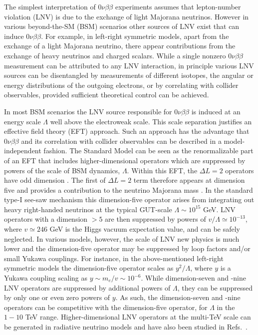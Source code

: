 \documentclass[letterpaper,11pt]{article}
\begin{document}
The simplest
interpretation of $0 \nu \beta \beta$ experiments assumes that lepton-number violation (LNV) is due to the exchange of light Majorana neutrinos. 
However in various beyond-the-SM (BSM) scenarios other sources of LNV exist that can induce $0\nu\beta\beta$. For example, in left-right symmetric models, apart from the exchange of a light Majorana neutrino, there appear contributions  from the exchange of heavy neutrinos and charged scalars. 
While a single nonzero $0 \nu \beta \beta$ measurement can be attributed to any LNV interaction, 
in principle various LNV sources  can be disentangled by measurements of different isotopes, the angular or energy distributions of the outgoing electrons, or by correlating with collider observables, 
provided sufficient theoretical control can be achieved. 

In most BSM scenarios the LNV source responsible for $0\nu\beta\beta$ is induced at an energy scale $\Lambda$ well above the electroweak scale. This scale separation justifies an effective field theory (EFT) approach. Such an approach has the advantage that $0\nu\beta\beta$ and its correlation with collider observables can be described in a model-independent fashion. The Standard Model can be seen as the renormalizable part of an EFT that includes higher-dimensional operators which are suppressed by powers of the scale of BSM dynamics, $\Lambda$. Within this EFT, the $\Delta L=2$ operators have odd dimension \cite{Kobach:2016ami}. The first of $\Delta L=2$ term therefore appears at dimension five and provides a contribution to the neutrino Majorana mass \cite{Weinberg:1979sa}. In the standard type-I see-saw mechanism this dimension-five operator arises from integrating out heavy right-handed neutrinos at the typical GUT-scale $\Lambda \sim 10^{15}$ GeV. LNV operators with a dimension $> 5$ are then suppressed by powers of $v/\Lambda \simeq 10^{-13}$, where $v\simeq 246$ GeV is the Higgs vacuum expectation value, and can be safely neglected. In various models, however, the scale of  LNV new physics is much lower and the dimension-five operator  may be suppressed by loop factors and/or  small Yukawa couplings. For instance, in the above-mentioned left-right symmetric models the dimension-five operator  scales as $y^2 /\Lambda$, where $y$ is a Yukawa coupling  scaling as $y \sim m_e/v \sim 10^{-6}$. While dimension-seven and -nine LNV operators  are suppressed by additional powers of $\Lambda$, they can be suppressed by only one or even zero powers of $y$. As such, the dimension-seven and -nine operators can be competitive with the dimension-five operator, for $\Lambda$ in the $1-10$ TeV range.
Higher-dimensional LNV operators at the multi-TeV scale can be generated in radiative neutrino models \cite{Zee:1980ai, Zee:1985id, Babu:1988ki, Babu:1988ig, Babu:1988wk, Babu:2001ex} and have also been studied in Refs.\ \cite{Babu:2001ex,Prezeau:2003xn,deGouvea:2007qla,Lehman:2014jma,Graesser:2016bpz}.
\end{document}
